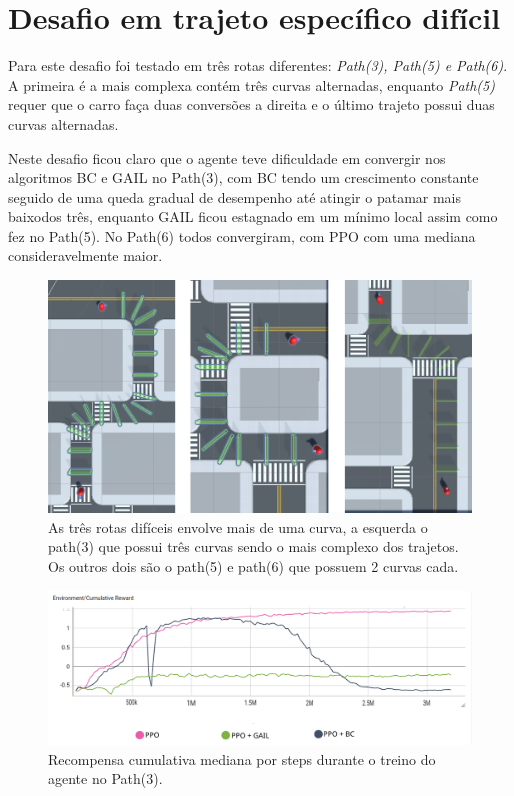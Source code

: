 \section{Desafio em trajeto específico difícil}
Para este desafio foi testado em três rotas diferentes: \textit{Path(3), Path(5) e Path(6)}. A primeira é a mais complexa contém três curvas alternadas, enquanto \textit{Path(5)} requer que o carro faça duas conversões a direita e o último trajeto possui duas curvas alternadas. 

Neste desafio ficou claro que o agente teve dificuldade em convergir nos algoritmos BC e GAIL no Path(3), com BC tendo um crescimento constante seguido de uma queda gradual de desempenho até atingir o patamar mais baixodos três, enquanto GAIL ficou estagnado em um mínimo local assim como fez no Path(5). No Path(6) todos convergiram, com PPO com uma mediana consideravelmente maior.

\begin{figure}[h]
    \centering
    \includegraphics{figs/treinos/desafio-dificil/rotas.png}
    \caption{As três rotas difíceis envolve mais de uma curva, a esquerda o path(3) que possui três curvas sendo o mais complexo dos trajetos. Os outros dois são o path(5) e path(6) que possuem 2 curvas cada.}
\end{figure}

\begin{figure}[h]
    \centering
    \includegraphics[scale=0.35]{figs/treinos/desafio-dificil/path-3_recompensas-algos.png}
    \caption{Recompensa cumulativa mediana por steps durante o treino do agente no Path(3).}
\end{figure}

